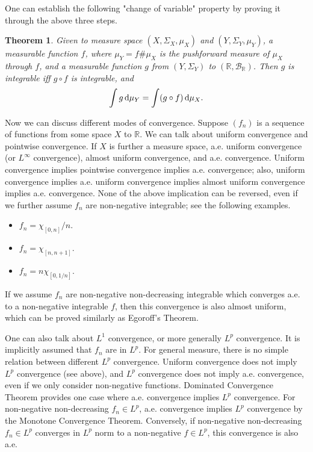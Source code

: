 \documentclass[openany]{book}
\newtheorem{theorem}{Theorem}[chapter]
\theoremstyle{definition}
\theoremstyle{remark}
\begin{document}
One can establish the following "change of variable" property by proving it through the above three steps.
\begin{theorem}
    Given to measure space $(X,\Sigma_X,\mu_X)$ and $(Y,\Sigma_Y,\mu_Y)$, a measurable function $f$, where $\mu_Y=f\#\mu_X$ is the pushforward measure of $\mu_X$ through $f$, and a measurable function $g$ from $(Y,\Sigma_Y)$ to $(\mathbb{R},\mathcal{B}_{\mathbb{R}})$. Then $g$ is integrable iff $g\circ f$ is integrable, and
    \begin{equation*}
        \int g \dif\mu_Y=\int(g\circ f)\dif\mu_X.
    \end{equation*}
\end{theorem}

Now we can discuss different modes of convergence. Suppose $(f_n)$ is a sequence of functions from some space $X$ to $\mathbb{R}$. We can talk about uniform convergence and pointwise convergence. If $X$ is further a measure space, a.e. uniform convergence (or $L^{\infty}$ convergence), almost uniform convergence, and a.e. convergence. Uniform convergence implies pointwise convergence implies a.e. convergence; also, uniform convergence implies a.e. uniform convergence implies almost uniform convergence implies a.e. convergence. None of the above implication can be reversed, even if we further assume $f_n$ are non-negative integrable; see the following examples.
\begin{itemize}
    \item $f_n=\chi_{[0,n]}/n$.
    \item $f_n=\chi_{[n,n+1]}$.
    \item $f_n=n\chi_{[0,1/n]}$.
\end{itemize}
If we assume $f_n$ are non-negative non-decreasing integrable which converges a.e. to a non-negative integrable $f$, then this convergence is also almost uniform, which can be proved similarly as Egoroff's Theorem.

One can also talk about $L^1$ convergence, or more generally $L^p$ convergence. It is implicitly assumed that $f_n$ are in $L^p$. For general measure, there is no simple relation between different $L^p$ convergence. Uniform convergence does not imply $L^p$ convergence (see above), and $L^p$ convergence does not imply a.e. convergence, even if we only consider non-negative functions. Dominated Convergence Theorem provides one case where a.e. convergence implies $L^p$ convergence. For non-negative non-decreasing $f_n\in L^p$, a.e. convergence implies $L^p$ convergence by the Monotone Convergence Theorem. Conversely, if non-negative non-decreasing $f_n\in L^p$ converges in $L^p$ norm to a non-negative $f\in L^p$, this convergence is also a.e.
\end{document}
